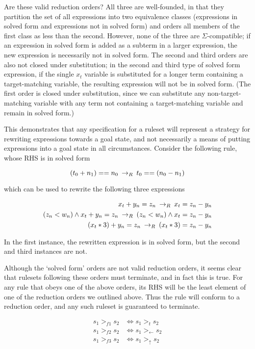 Are these valid reduction orders? All three are well-founded, in that they partition the set of all expressions into two equivalence classes (expressions in solved form and expressions not in solved form) and orders all members of the first class as less than the second. However, none of the three are $\Sigma$-compatible; if an expression in solved form is added as a subterm in a larger expression, the new expression is necessarily not in solved form. The second and third orders are also not closed under substitution; in the second and third type of solved form expression, if the single $x_t$ variable is substituted for a longer term containing a target-matching variable, the resulting expression will not be in solved form. (The first order is closed under substitution, since we can substitute any non-target-matching variable with any term not containing a target-matching variable and remain in solved form.)

This demonstrates that any specification for a ruleset will represent a strategy for rewriting expressions towards a goal state, and not necessarily a means of putting expressions into a goal state in all circumstances. Consider the following rule, whose RHS is in solved form

\[ (t_0 + n_1) == n_0 \:\rightarrow_{R}\: t_0 == (n_0 - n_1)
\]

which can be used to rewrite the following three expressions

\begin{align*}
x_t + y_n = z_n \:\rightarrow_{R}\: x_t = z_n - y_n \\
(z_n < w_n) \wedge x_t + y_n = z_n \:\rightarrow_{R}\: (z_n < w_n) \wedge x_t = z_n - y_n \\
(x_t * 3) + y_n = z_n \:\rightarrow_{R}\: (x_t * 3) = z_n - y_n 
\end{align*}

In the first instance, the rewritten expression is in solved form, but the second and third instances are not.

Although the `solved form' orders are not valid reduction orders, it seems clear that rulesets following these orders must terminate, and in fact this is true. For any rule that obeys one of the above orders, its RHS will be the least element of one of the reduction orders we outlined above. Thus the rule will conform to a reduction order, and any such ruleset is guaranteed to terminate.

\begin{align*}
s_1 >_{f1} s_2 &\iff s_1 >_{t} s_2 \\
s_1 >_{f2} s_2 &\iff s_1 >_{\leftarrow} s_2 \\
s_1 >_{f3} s_2 &\iff s_1 >_{\uparrow} s_2
\end{align*}

